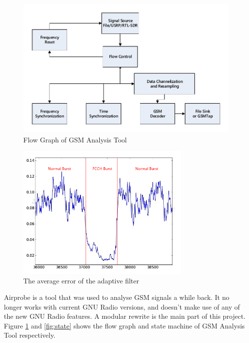\documentclass[a4paper,12pt,oneside]{article}
\begin{document}
\begin{figure}[!h]
\centering\includegraphics[width=5.2in]{figure/flowgraph.pdf}
\caption{Flow Graph of GSM Analysis Tool \label{fig:3}}
\end{figure}
\begin{figure}[!h]
\centering\includegraphics[width=3.4in]{figure/fcch_detect.png}
\caption{The average error of the adaptive filter\label{fig:fch}}
\end{figure}
Airprobe is a tool that was used to analyse GSM signals a while back. It no longer works with current GNU Radio versions, and doesn't make use of any of the new GNU Radio features. A modular rewrite is the main part of this project.
Figure \ref{fig:3} and \ref{fig:state} shows the flow graph and state machine of GSM Analysis Tool respectively.
\end{document}
